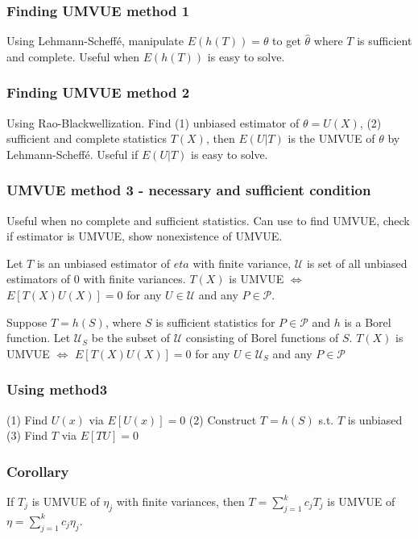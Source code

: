 \subsubsection{Finding UMVUE method 1}

Using Lehmann-Scheffé, manipulate $E(h(T))=\theta$ to get $\hat\theta$ where $T$ is sufficient and complete. Useful when $E(h(T))$ is easy to solve.

\subsubsection{Finding UMVUE method 2}

Using Rao-Blackwellization. Find (1) unbiased estimator of $\theta=U(X)$, (2) sufficient and complete statistics $T(X)$, then $E(U|T)$ is the UMVUE of $\theta$ by Lehmann-Scheffé. Useful if $E(U|T)$ is easy to solve.

\subsubsection{UMVUE method 3 - necessary and sufficient condition}

Useful when no complete and sufficient statistics. Can use to find UMVUE, check if estimator is UMVUE, show nonexistence of UMVUE.

Let $T$ is an unbiased estimator of $eta$ with finite variance, $\mathcal{U}$ is set of all unbiased estimators of 0 with finite variances.
$T(X)$ is UMVUE $\Leftrightarrow$ $E[T(X)U(X)]=0$ for any $U\in\mathcal{U}$ and any $P\in\mathcal{P}$.

Suppose $T=h(S)$, where $S$ is sufficient statistics for $P\in\mathcal{P}$ and $h$ is a Borel function. Let $\mathcal{U}_S$ be the subset of $\mathcal{U}$ consisting of Borel functions of $S$.
$T(X)$ is UMVUE $\Leftrightarrow$ $E[T(X)U(X)]=0$ for any $U\in\mathcal{U}_S$ and any $P\in\mathcal{P}$

\subsubsection{Using method3}

(1) Find $U(x)$ via $E[U(x)]=0$ (2) Construct $T=h(S)$ s.t. $T$ is unbiased (3) Find $T$ via $E[TU]=0$

\subsubsection{Corollary}

If $T_j$ is UMVUE of $\eta_j$ with finite variances, then $T=\sum_{j=1}^k c_jT_j$ is UMVUE of $\eta=\sum_{j=1}^k c_j\eta_j$.


